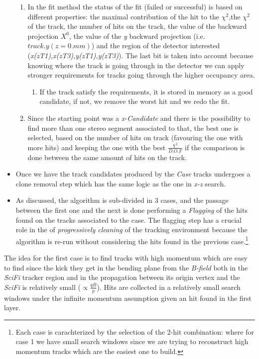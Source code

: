 \documentclass[paper=a4, fontsize=10pt]{scrartcl}
\numberwithin{equation}{section}		%
\numberwithin{figure}{section}			%
\numberwithin{table}{section}				%
\begin{document}
\begin{itemize}
\begin{enumerate}
   \item{In the fit method the status of the fit (failed or successful) is based on different properties: the maximal contribution of the hit to the $\chi^{2}$,the $\chi^{2}$ of the track, the number of hits on the track, the value of the backward projection $X^{0}$, the value of the \textit{y} backward projection (i.e. $track.y(z=0.mm)$) and the region of the detector interested (\textit{x(zT1),x(zT3),y(zT1),y(zT3)}). The last bit is taken into account because knowing where the track is going through in the detector we can apply stronger requirements for tracks going through the higher occupancy area.}
     \begin{enumerate}
      \item{If the track satisfy the requirements, it is stored in memory as a good candidate, if not, we remove the worst hit and we redo the fit.} 
     \end{enumerate}
   \item{Since the starting point was a \textit{x-Candidate} and there is the possibility to find more than one stereo segment associated to that, the best one is selected, based on the number of hits on track (favouring the one with more hits) and keeping the one with the best $\frac{\chi^{2}}{D.O.F}$ if the comparison is done between the same amount of hits on the track.}
   \end{enumerate}
 \item{Once we have the track candidates produced by the \textit{Case} tracks undergoes a clone removal step which has the same logic as the one in \textit{x-z} search.}
 \item{As discussed, the algorithm is sub-divided in 3 cases, and the passage between the first one and the next is done performing a \textit{Flagging} of the hits found on the tracks associated to the case. The flagging step has a crucial role in the of \textit{progressively cleaning} of the tracking environment because the algorithm is re-run without considering the hits found in the previous case.\footnote{Each case is carachterized by the selection of the 2-hit combination: where for case 1 we have small search windows since we are trying to reconstruct high momentum tracks which are the easiest one to build.}}
\end{itemize}
  

    



The idea for the first case is to find tracks with high momentum which are easy to find since the kick they get in the bending plane from the \textit{B-field} both in the \textit{SciFi} tracker region and in the propagation between its origin vertex and the \textit{SciFi} is relatively small ($\propto \frac{qB}{p}$). 
Hits are collected in a relatively small search windows under the infinite momentum assumption given an hit found in the first layer.
\end{document}
